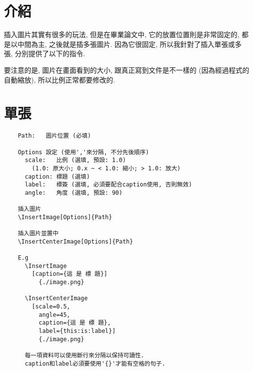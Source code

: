 \section{介紹}

插入圖片其實有很多的玩法, 但是在畢業論文中, 它的放置位置則是非常固定的, 都是以中間為主, 之後就是插多張圖片. 因為它很固定, 所以我針對了插入單張或多張, 分別提供了以下的指令.

要注意的是, 圖片在畫面看到的大小, 跟真正寫到文件是不一樣的 (因為經過程式的自動縮放), 所以比例正常都要修改的.


\newpage
\section{單張}

  \begin{framed}
  \begin{verbatim}
    Path:   圖片位置 (必填)

    Options 設定 (使用','來分隔, 不分先後順序)
      scale:   比例 (選填, 預設: 1.0)
        (1.0: 原大小; 0.x ~ < 1.0: 縮小; > 1.0: 放大)
      caption: 標題 (選填)
      label:   標簽 (選填, 必須要配合caption使用, 否則無效)
      angle:   角度 (選填, 預設: 90)

    插入圖片
    \InsertImage[Options]{Path}

    插入圖片並置中
    \InsertCenterImage[Options]{Path}

    E.g
      \InsertImage
        [caption={這 是 標 題}]
          {./image.png}

      \InsertCenterImage
        [scale=0.5,
          angle=45,
          caption={這 是 標 題},
          label={this:is:label}]
          {./image.png}

      每一項資料可以使用斷行來分隔以保持可讀性.
      caption和label必須要使用'{}'才能有空格的句子.
  \end{verbatim}
  \end{framed}

  \newpage

